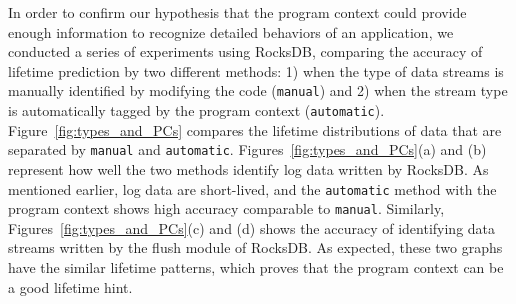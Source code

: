 In order to confirm our hypothesis that the program context could provide
enough information to recognize detailed behaviors of an application, we
conducted a series of experiments using RocksDB, comparing the accuracy of
lifetime prediction by two different methods: 1) when the type of data streams
is manually identified by modifying the code (\texttt{manual}) and 2) when the
stream type is automatically tagged by the program context
(\texttt{automatic}).  Figure~\ref{fig:types_and_PCs} compares the lifetime
distributions of data that are separated by \texttt{manual} and
\texttt{automatic}.  Figures~\ref{fig:types_and_PCs}(a) and (b) represent how
well the two methods identify log data written by
RocksDB.  As mentioned earlier, log data are short-lived, and the
\texttt{automatic} method with the program context shows high accuracy
comparable to \texttt{manual}. Similarly, Figures~\ref{fig:types_and_PCs}(c)
and (d) shows the accuracy of identifying data streams written by the flush
module of RocksDB.  As expected, these two graphs have the similar lifetime
patterns, which proves that the program context can be a good lifetime hint.






